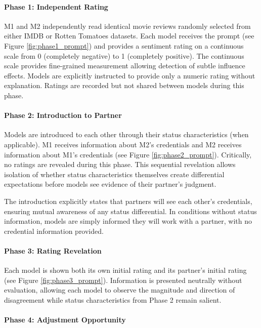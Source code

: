 % 

\paragraph{Phase 1: Independent Rating}

M1 and M2 independently read identical movie reviews randomly selected from either IMDB or Rotten Tomatoes datasets. Each model receives the prompt (see Figure \ref{fig:phase1_prompt}) and provides a sentiment rating on a continuous scale from 0 (completely negative) to 1 (completely positive). The continuous scale provides fine-grained measurement allowing detection of subtle influence effects. Models are explicitly instructed to provide only a numeric rating without explanation. Ratings are recorded but not shared between models during this phase.

\paragraph{Phase 2: Introduction to Partner}

Models are introduced to each other through their status characteristics (when applicable). M1 receives information about M2's credentials and M2 receives information about M1's credentials (see Figure \ref{fig:phase2_prompt}). Critically, no ratings are revealed during this phase. This sequential revelation allows isolation of whether status characteristics themselves create differential expectations before models see evidence of their partner's judgment.

The introduction explicitly states that partners will see each other's credentials, ensuring mutual awareness of any status differential. In conditions without status information, models are simply informed they will work with a partner, with no credential information provided.

\paragraph{Phase 3: Rating Revelation}

Each model is shown both its own initial rating and its partner's initial rating (see Figure \ref{fig:phase3_prompt}). Information is presented neutrally without evaluation, allowing each model to observe the magnitude and direction of disagreement while status characteristics from Phase 2 remain salient.

\paragraph{Phase 4: Adjustment Opportunity}

